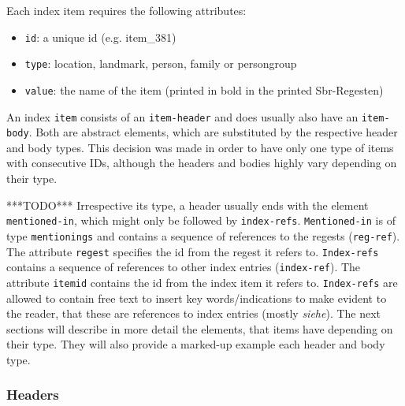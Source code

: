 Each index item requires the following attributes: 
\begin{itemize}
\item \texttt{id}: a unique id (e.g. item\_381)
\item \texttt{type}: location, landmark, person, family or persongroup
\item \texttt{value}: the name of the item (printed in bold in the printed Sbr-Regesten)
\end{itemize}


An index \texttt{item} consists of an \texttt{item-header} and does usually also have an \texttt{item-body}. Both are abstract elements, which are substituted by the respective header and body types. This decision was made in order to have only one type of items with consecutive IDs, although the headers and bodies highly vary depending on their type.

***TODO***
Irrespective its type, a header usually ends with the element \texttt{mentioned-in}, which might only be followed by \texttt{index-refs}. \texttt{Mentioned-in} is of type \texttt{mentionings} and contains a sequence of references to the regests (\texttt{reg-ref}). The attribute \texttt{regest} specifies the id from the regest it refers to. \texttt{Index-refs} contains  a sequence of references to other index entries (\texttt{index-ref}). The attribute \texttt{itemid} contains the id from the index item it refers to. \texttt{Index-refs} are allowed to contain free text to insert key words/indications to make evident to the reader, that these are references to index entries (mostly \textit{siehe}).
The next sections will describe in more detail the elements, that items have depending on their type. They will also provide a marked-up example each header and body type.

\subsubsection{Headers}
\label{header-xml}

